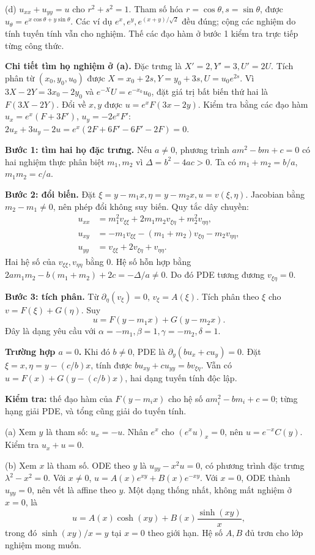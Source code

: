 (d) $u_{xx}+u_{yy}=u$ cho $r^2+s^2=1$. Tham số hóa $r=\cos\theta,s=\sin\theta$, được $u_\theta=e^{x\cos\theta+y\sin\theta}$. Các ví dụ $e^x,e^y,e^{(x+y)/\sqrt2}$ đều đúng; cộng các nghiệm do tính tuyến tính vẫn cho nghiệm. Thế các đạo hàm ở bước 1 kiểm tra trực tiếp từng công thức.

\textbf{Chi tiết tìm họ nghiệm ở (a).} Đặc trưng là $X'=2,Y'=3,U'=2U$. Tích phân từ $(x_0,y_0,u_0)$ được $X=x_0+2s,Y=y_0+3s,U=u_0e^{2s}$. Vì $3X-2Y=3x_0-2y_0$ và $e^{-X}U=e^{-x_0}u_0$, đặt giá trị bất biến thứ hai là $F(3X-2Y)$. Đổi về $x,y$ được $u=e^xF(3x-2y)$. Kiểm tra bằng các đạo hàm $u_x=e^x(F+3F')$, $u_y=-2e^xF'$: $2u_x+3u_y-2u=e^x(2F+6F'-6F'-2F)=0$.

\textbf{Bước 1: tìm hai họ đặc trưng.} Nếu $a\ne0$, phương trình $am^2-bm+c=0$ có hai nghiệm thực phân biệt $m_1,m_2$ vì $\Delta=b^2-4ac>0$. Ta có $m_1+m_2=b/a$, $m_1m_2=c/a$.

\textbf{Bước 2: đổi biến.} Đặt $\xi=y-m_1x,\eta=y-m_2x,u=v(\xi,\eta)$. Jacobian bằng $m_2-m_1\ne0$, nên phép đổi không suy biến. Quy tắc dây chuyền:
\begin{align*}
u_{xx}&=m_1^2v_{\xi\xi}+2m_1m_2v_{\xi\eta}+m_2^2v_{\eta\eta},\\
u_{xy}&=-m_1v_{\xi\xi}-(m_1+m_2)v_{\xi\eta}-m_2v_{\eta\eta},\\
u_{yy}&=v_{\xi\xi}+2v_{\xi\eta}+v_{\eta\eta}.
\end{align*}
Hai hệ số của $v_{\xi\xi},v_{\eta\eta}$ bằng 0. Hệ số hỗn hợp bằng $2am_1m_2-b(m_1+m_2)+2c=-\Delta/a\ne0$. Do đó PDE tương đương $v_{\xi\eta}=0$.

\textbf{Bước 3: tích phân.} Từ $\partial_\eta(v_\xi)=0$, $v_\xi=A(\xi)$. Tích phân theo $\xi$ cho $v=F(\xi)+G(\eta)$. Suy
\[\boxed{u=F(y-m_1x)+G(y-m_2x).}\]
Đây là dạng yêu cầu với $\alpha=-m_1,\beta=1,\gamma=-m_2,\delta=1$.

\textbf{Trường hợp $a=0$.} Khi đó $b\ne0$, PDE là $\partial_y(bu_x+cu_y)=0$. Đặt $\xi=x,\eta=y-(c/b)x$, tính được $bu_{xy}+cu_{yy}=b v_{\xi\eta}$. Vẫn có $u=F(x)+G(y-(c/b)x)$, hai dạng tuyến tính độc lập.

\textbf{Kiểm tra:} thế đạo hàm của $F(y-m_ix)$ cho hệ số $am_i^2-bm_i+c=0$; từng hạng giải PDE, và tổng cũng giải do tuyến tính.

(a) Xem $y$ là tham số: $u_x=-u$. Nhân $e^x$ cho $(e^xu)_x=0$, nên $u=e^{-x}C(y)$. Kiểm tra $u_x+u=0$.

(b) Xem $x$ là tham số. ODE theo $y$ là $u_{yy}-x^2u=0$, có phương trình đặc trưng $\lambda^2-x^2=0$. Với $x\ne0$, $u=A(x)e^{xy}+B(x)e^{-xy}$. Với $x=0$, ODE thành $u_{yy}=0$, nên vết là affine theo $y$. Một dạng thống nhất, không mất nghiệm ở $x=0$, là
\[u=A(x)\cosh(xy)+B(x)\frac{\sinh(xy)}x,\]
trong đó $\sinh(xy)/x=y$ tại $x=0$ theo giới hạn. Hệ số $A,B$ đủ trơn cho lớp nghiệm mong muốn.

